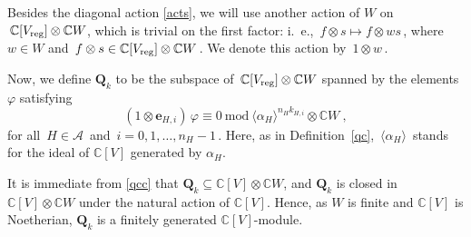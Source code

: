 \documentclass{amsart}
\theoremstyle{definition}
\theoremstyle{remark}
\numberwithin{equation}{section}
\begin{document}
Besides the diagonal action \eqref{acts}, we will use another action
of $W$ on $\, {\mathbb{C}}[{V_{\rm{reg}}}] \otimes {\mathbb{C}} W $, which is trivial on the
first factor: i.~e., $\, f
\otimes s \mapsto f \otimes w s\,$, where $ w \in W $ and $\, f
\otimes s \in {\mathbb{C}}[{V_{\rm{reg}}}] \otimes {\mathbb{C}} W \,$. We denote this action by
$\, 1 \otimes w \,$.

Now, we define $ {\mathbf{Q}}_k $ to be the subspace of $\,{\mathbb{C}} [{V_{\rm{reg}}}] \otimes
{\mathbb{C}} W $ spanned by the elements $ \varphi $ satisfying
\begin{equation}
\label{qcc} (1 \otimes {\boldsymbol{e}}_{H,i})\,\varphi \equiv 0 \ \mbox{mod}\
\langle\alpha_H\rangle^{n_H k_{H,i}} \otimes {\mathbb{C}} W \ ,
\end{equation}
for all  $\, H \in {\mathcal{A}}\,$ and $\,i = 0, 1, \ldots, n_H-1 \,$.
Here, as in Definition~\ref{qc}, $\,\langle \alpha_H \rangle\,$
stands for the ideal of $ {\mathbb{C}}[V] $ generated by  $ \alpha_H $.

It is immediate from \eqref{qcc} that $ {\mathbf{Q}}_k \subseteq {\mathbb{C}}[V]
\otimes {\mathbb{C}} W $, and $ {\mathbf{Q}}_k $ is closed in $ {\mathbb{C}}[V] \otimes {\mathbb{C}} W $
under the natural action of $ {\mathbb{C}}[V] $. Hence, as $W$ is finite and
$ {\mathbb{C}}[V] $ is Noetherian, $ {\mathbf{Q}}_k $ is a finitely generated $
{\mathbb{C}}[V]$-module.
\end{document}
